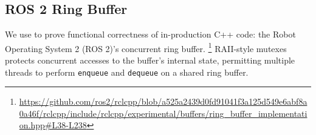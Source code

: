 \subsection{ROS 2 Ring Buffer}
\label{sec:ros-ring-buffer}

We use  to prove functional correctness of in-production C++ code: the Robot Operating System 2 (ROS 2)'s concurrent ring
buffer.
\footnote{\url{https://github.com/ros2/rclcpp/blob/a525a2439d0fd91041f3a125d549e6abf8a0a46f/rclcpp/include/rclcpp/experimental/buffers/ring_buffer_implementation.hpp\#L38-L238}} 
RAII-style mutexes protects concurrent accesses to the buffer's internal state, permitting multiple threads to perform \lstinline|enqueue| and \lstinline|dequeue| on a shared ring buffer. 

